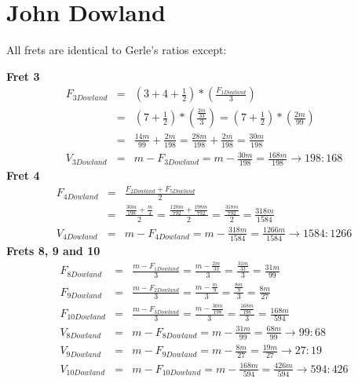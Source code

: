 \section{John Dowland}
All frets are identical to Gerle's ratios except:

\textbf{Fret 3}
\begin{eqnarray*}
    F_{3Dowland}
        &=& ( 3 + 4 + \frac{1}{2} ) * ( \frac{F_{1Dowland}}{3} ) \\
        &=& ( 7 + \frac{1}{2} ) * ( \frac{\frac{2m}{33}}{3} )
        = ( 7 + \frac{1}{2} ) * ( \frac{2m}{99} ) \\
        &=& \frac{14m}{99} + \frac{2m}{198}
        = \frac{28m}{198} + \frac{2m}{198}
        = \frac{30m}{198} \\
    V_{3Dowland}
        &=& m - F_{3Dowland}
        = m - \frac{30m}{198}
        = \frac{168m}{198}
        \to 198:168
\end{eqnarray*}
\textbf{Fret 4}
\begin{eqnarray*}
    F_{4Dowland}
        &=& \frac{F_{2Dowland} + F_{5Dowland}}{2} \\
        &=& \frac{\frac{30m}{198} + \frac{m}{4}}{2}
        = \frac{\frac{120m}{792} + \frac{198m}{792}}{2}
        = \frac{\frac{318m}{792}}{2}
        = \frac{318m}{1584} \\
    V_{4Dowland}
        &=& m - F_{4Dowland}
        = m - \frac{318m}{1584}
        = \frac{1266m}{1584}
        \to 1584:1266
\end{eqnarray*}
\textbf{Frets 8, 9 and 10}
\begin{eqnarray*}
    F_{8Dowland}
        &=& \frac{m-F_{1Dowland}}{3}
        = \frac{m - \frac{2m}{33}}{3}
        = \frac{\frac{31m}{33}}{3}
        = \frac{31m}{99} \\
    F_{9Dowland}
        &=& \frac{m-F_{2Dowland}}{3}
        = \frac{m - \frac{m}{9}}{3}
        = \frac{\frac{8m}{9}}{3}
        = \frac{8m}{27} \\
    F_{10Dowland}
        &=& \frac{m-F_{3Dowland}}{3}
        = \frac{m - \frac{30m}{198}}{3}
        =\frac{\frac{168m}{198}}{3}
        =\frac{168m}{594} \\
    V_{8Dowland}
        &=& m - F_{8Dowland}
        = m - \frac{31m}{99}
        = \frac{68m}{99}
        \to 99:68 \\
    V_{9Dowland}
        &=& m - F_{9Dowland}
        = m - \frac{8m}{27}
        = \frac{19m}{27}
        \to 27:19 \\
    V_{10Dowland}
        &=& m - F_{10Dowland}
        = m - \frac{168m}{594}
        = \frac{426m}{594}
        \to 594:426
\end{eqnarray*}

